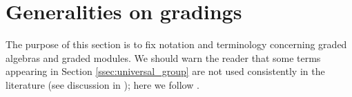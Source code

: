 \chapter{Generalities on gradings}\label{sec:generalities}


The purpose of this section is to fix notation and terminology concerning graded algebras and graded modules. We should warn the reader that some terms appearing in Section \ref{ssec:universal_group} are not used consistently in the literature (see discussion in \cite[\S 2.7]{GS}); here we follow \cite{livromicha}.









